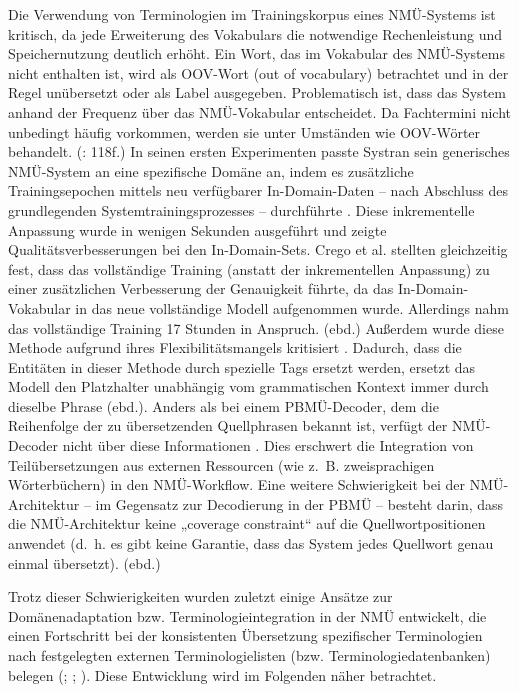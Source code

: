Die Verwendung von Terminologien im Trainingskorpus eines NMÜ-Systems ist kritisch, da jede Erweiterung des Vokabulars die notwendige Rechenleistung und Speichernutzung deutlich erhöht. Ein Wort, das im Vokabular des NMÜ-Systems nicht enthalten ist, wird als OOV-Wort (out of vocabulary) betrachtet und in der Regel unübersetzt oder als Label ausgegeben. Problematisch ist, dass das System anhand der Frequenz über das NMÜ-Vokabular entscheidet. Da Fachtermini nicht unbedingt häufig vorkommen, werden sie unter Umständen wie OOV-Wörter behandelt. (\citealt{Eisold2017}: 118f.) In seinen ersten Experimenten passte Systran sein generisches NMÜ-System an eine spezifische Domäne an, indem es zusätzliche Trainingsepochen mittels neu verfügbarer In-Domain-Daten -- nach Abschluss des grundlegenden Systemtrainingsprozesses -- durchführte \citep{CregoEtAl2016}. Diese inkrementelle Anpassung wurde in wenigen Sekunden ausgeführt und zeigte Qualitätsverbesserungen bei den In-Domain-Sets. Crego et al. stellten gleichzeitig fest, dass das vollständige Training (anstatt der inkrementellen Anpassung) zu einer zusätzlichen Verbesserung der Genauigkeit führte, da das In-Domain-Vokabular in das neue vollständige Modell aufgenommen wurde. Allerdings nahm das vollständige Training 17 Stunden in Anspruch. (ebd.) Außerdem wurde diese Methode aufgrund ihres Flexibilitätsmangels kritisiert \citep{DinuEtAl2019}. Dadurch, dass die Entitäten in dieser Methode durch spezielle Tags ersetzt werden, ersetzt das Modell den Platzhalter unabhängig vom grammatischen Kontext immer durch dieselbe Phrase (ebd.). Anders als bei einem PBMÜ-Decoder, dem die Reihenfolge der zu übersetzenden Quellphrasen bekannt ist, verfügt der NMÜ-Decoder nicht über diese Informationen \citep{ChatterjeeEtAl2017}. Dies erschwert die Integration von Teilübersetzungen aus externen Ressourcen (wie z.~B. zweisprachigen Wörterbüchern) in den NMÜ-Workflow. Eine weitere Schwierigkeit bei der NMÜ-Architektur -- im Gegensatz zur Decodierung in der PBMÜ -- besteht darin, dass die NMÜ-Architektur keine „coverage constraint“ auf die Quellwortpositionen anwendet (d.~h. es gibt keine Garantie, dass das System jedes Quellwort genau einmal übersetzt). (ebd.)

Trotz dieser Schwierigkeiten wurden zuletzt einige Ansätze zur Domänenadaptation bzw. Terminologieintegration in der NMÜ entwickelt, die einen Fortschritt bei der konsistenten Übersetzung spezifischer Terminologien nach festgelegten externen Terminologielisten (bzw. Terminologiedatenbanken) belegen (\citealt{ChatterjeeEtAl2017}; \citealt{HaslerEtAl2018}; \citealt{DinuEtAl2019}). Diese Entwicklung wird im Folgenden näher betrachtet.

